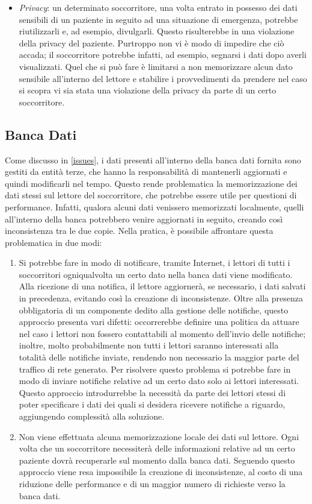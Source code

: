 \documentclass[a4paper,12pt]{report}
\begin{document}
\begin{itemize}
	\item \emph{Privacy}: un determinato soccorritore, una volta entrato in possesso dei dati sensibili di un paziente in seguito ad una situazione di emergenza, potrebbe riutilizzarli e, ad esempio, divulgarli. Questo risulterebbe in una violazione della privacy del paziente. Purtroppo non vi è modo di impedire che ciò accada; il soccorritore potrebbe infatti, ad esempio, segnarsi i dati dopo averli visualizzati. Quel che si può fare è limitarsi a non memorizzare alcun dato sensibile all'interno del lettore e stabilire i provvedimenti da prendere nel caso si scopra vi sia stata una violazione della privacy da parte di un certo soccorritore.
\end{itemize}

\subsection{Banca Dati}

Come discusso in \autoref{issues}, i dati presenti all'interno della banca dati fornita sono gestiti da entità terze, che hanno la responsabilità di mantenerli aggiornati e quindi modificarli nel tempo. Questo rende problematica la memorizzazione dei dati stessi sul lettore del soccorritore, che potrebbe essere utile per questioni di performance. Infatti, qualora alcuni dati venissero memorizzati localmente, quelli all'interno della banca potrebbero venire aggiornati in seguito, creando così inconsistenza tra le due copie. Nella pratica, è possibile affrontare questa problematica in due modi:
\begin{enumerate}
	\item Si potrebbe fare in modo di notificare, tramite Internet, i lettori di tutti i soccorritori ogniqualvolta un certo dato nella banca dati viene modificato. Alla ricezione di una notifica, il lettore aggiornerà, se necessario, i dati salvati in precedenza, evitando così la creazione di inconsistenze. Oltre alla presenza obbligatoria di un componente dedito alla gestione delle notifiche, questo approccio presenta vari difetti: occorrerebbe definire una politica da attuare nel caso i lettori non fossero contattabili al momento dell'invio delle notifiche; inoltre, molto probabilmente non tutti i lettori saranno interessati alla totalità delle notifiche inviate, rendendo non necessario la maggior parte del traffico di rete generato. Per risolvere questo problema si potrebbe fare in modo di inviare notifiche relative ad un certo dato solo ai lettori interessati. Questo approccio introdurrebbe la necessità da parte dei lettori stessi di poter specificare i dati dei quali si desidera ricevere notifiche a riguardo, aggiungendo complessità alla soluzione.
	\item Non viene effettuata alcuna memorizzazione locale dei dati sul lettore. Ogni volta che un soccorritore necessiterà delle informazioni relative ad un certo paziente dovrà recuperarle sul momento dalla banca dati. Seguendo questo approccio viene resa impossibile la creazione di inconsistenze, al costo di una riduzione delle performance e di un maggior numero di richieste verso la banca dati.
\end{enumerate} 
\end{document}
